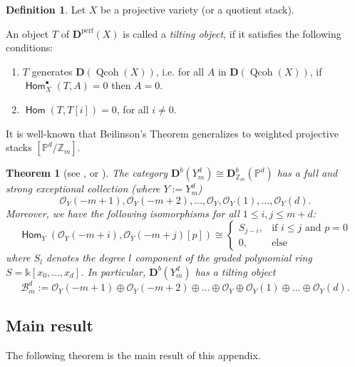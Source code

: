 \documentclass[a4paper,11pt, reqno]{amsart}
\def\P{\mathbb P}
\def\Z{\mathbb Z}
\def\DD{\mathbf D}
\def\OO{\mathcal O}
\def\sB{\mathscr{B}}
\def\Qcoh{{\operatorname{Qcoh}}}
\newcommand{\opname}[1]{\operatorname{\mathsf{#1}}}
\newcommand{\Hom}{\opname{Hom}}
\def\Db{\DD^b}
\def\Dperf{\DD^{\mathrm{perf}}}
\theoremstyle{plain}
\newtheorem{theorem}[dummy]{Theorem}
\theoremstyle{definition}
\newtheorem{definition}[dummy]{Definition}
\numberwithin{equation}{section}
\begin{document}
\begin{definition}
Let $X$ be a projective variety (or a quotient stack).

An object $T$ of $\Dperf(X)$ is called a \emph{tilting object}, if it satisfies the following conditions:
\begin{enumerate}
    \item $T$ generates $\DD(\Qcoh(X))$, i.e. for all $A$ in $\DD(\Qcoh(X))$, if $\Hom^\bullet_{X} (T , A) = 0 $ then $A=0$. 
    \item $\Hom (T , T [i]) = 0$, for all $i \neq 0$. 
\end{enumerate}
\end{definition}



It is well-known that Beilinson's Theorem generalizes to weighted projective stacks $[\P^d / \Z_m ]$.

\begin{theorem}[{see \cite[Section 5]{kawamata0}, or \cite[Proposition 2.7 and Theorem 2.12]{auroux-katzarkov-orlov}}]\label{thm:stack-exc-coll}
   The category $\Db(Y_m^d) \cong \Db_{\Z_m} ( \P^d )$ has a full and strong exceptional collection (where $Y:=Y_m^d$)
\[
  \OO_Y (-m+1) , \OO_Y ( -m+2 ) ,\ldots , \OO_Y , \OO_Y (1) , \ldots , \OO_Y (d) .
\]
Moreover, we have the following isomorphisms for all $1\leq i , j \leq m+d$:
\begin{equation}\label{eq:equiv-except-hom}
    \Hom_Y ( \OO_Y (-m + i ) , \OO_Y (-m+j) [p] ) \cong \begin{cases}
        S_{j-i},& \text{if $i\leq j$ and $p=0$} \\
        0,& \text{else}
    \end{cases}
\end{equation}
where $S_l$ denotes the degree $l$ component of the graded polynomial ring $S= \mathbb{k}[x_0, \ldots, x_d]$.
In particular, $\Db (Y_m^d)$ has a tilting object
\begin{equation}\label{eq:tilting-wps}
    \sB_m^d :=\OO_Y (-m+1) \oplus \OO_Y (-m+2) \oplus \ldots \oplus \OO_Y \oplus \OO_Y (1)  \oplus \ldots \oplus \OO_Y (d) .
\end{equation}
\end{theorem}
 




\subsection{Main result}
The following theorem is the main result of this appendix.
\end{document}
